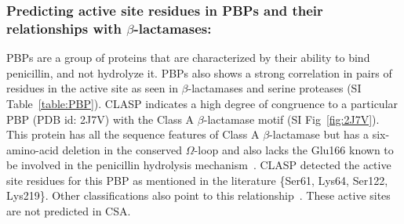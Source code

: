 
\subsubsection{Predicting active site residues in PBPs and their relationships with $\beta$-lactamases:}
PBPs are a group of proteins that are characterized by their ability to bind penicillin, and not hydrolyze it. PBPs also shows a strong correlation in pairs of residues in the active site as seen in $\beta$-lactamases and serine proteases (SI Table~\ref{table:PBP}).
CLASP indicates a high degree of congruence to a particular PBP (PDB id: 2J7V) with the Class A $\beta$-lactamase motif (SI Fig~\ref{fig:2J7V}). This protein has all the sequence features of Class A $\beta$-lactamase but has a six-amino-acid deletion in the conserved $\Omega$-loop and also lacks the Glu166 known to be involved in the penicillin hydrolysis mechanism~\citep{PBP_BL}. CLASP detected the active site residues for this PBP as mentioned in the literature \{Ser61, Lys64, Ser122, Lys219\}.
Other classifications also point to this relationship~\citep{PFAM,DALI}. 
These active sites are not predicted in CSA.
